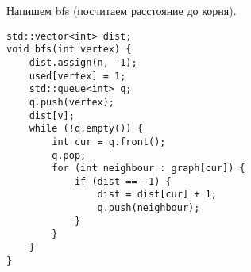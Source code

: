 \documentclass[12pt, a4paper]{article}
\begin{document}
    \newpage
    Напишем bfs (посчитаем расстояние до корня).
    \begin{lstlisting}
std::vector<int> dist;
void bfs(int vertex) {
    dist.assign(n, -1);
    used[vertex] = 1;
    std::queue<int> q;
    q.push(vertex);
    dist[v];
    while (!q.empty()) {
        int cur = q.front();
        q.pop;
        for (int neighbour : graph[cur]) {
            if (dist == -1) {
                dist = dist[cur] + 1;
                q.push(neighbour);
            }
        }
    }
}
    \end{lstlisting}
\end{document}
